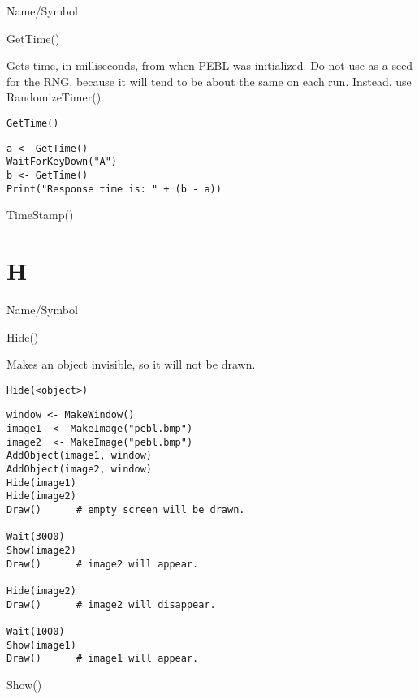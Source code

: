 \rl



\begin{desc}{Name/Symbol}
\item[Name/Symbol]	GetTime()

\item[Description]	Gets time, in milliseconds, from when PEBL was initialized. 
	Do not use as a seed for the RNG, because it will tend to be 
	about the same on each run. Instead, use RandomizeTimer().

\item[Usage]
\begin{verbatim}
GetTime()
\end{verbatim}

\item[Example]
\begin{verbatim}
a <- GetTime()
WaitForKeyDown("A")
b <- GetTime()
Print("Response time is: " + (b - a))
\end{verbatim}

\item[See Also]	TimeStamp()
\end{desc}

\rl

\section{H}
\rl



\begin{desc}{Name/Symbol}
\item[Name/Symbol]	Hide() 

\item[Description]	Makes an object invisible, so it will not be drawn.

\item[Usage]
\begin{verbatim}
Hide(<object>)
\end{verbatim}

\item[Example]
\begin{verbatim}
window <- MakeWindow()
image1  <- MakeImage("pebl.bmp")
image2  <- MakeImage("pebl.bmp")
AddObject(image1, window)
AddObject(image2, window)
Hide(image1)
Hide(image2)
Draw()		# empty screen will be drawn.
	
Wait(3000)
Show(image2)
Draw()		# image2 will appear.

Hide(image2)
Draw()		# image2 will disappear.

Wait(1000)
Show(image1)
Draw()		# image1 will appear.
\end{verbatim}
 
\item[See Also]	Show()
\end{desc}

